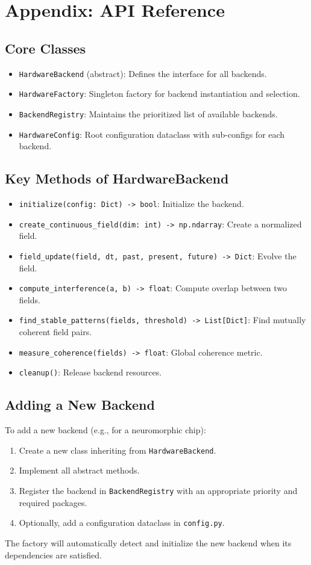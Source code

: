 \section{Appendix: API Reference}

\subsection{Core Classes}
\begin{itemize}
    \item \texttt{HardwareBackend} (abstract): Defines the interface for all backends.
    \item \texttt{HardwareFactory}: Singleton factory for backend instantiation and selection.
    \item \texttt{BackendRegistry}: Maintains the prioritized list of available backends.
    \item \texttt{HardwareConfig}: Root configuration dataclass with sub-configs for each backend.
\end{itemize}

\subsection{Key Methods of HardwareBackend}
\begin{itemize}
    \item \texttt{initialize(config: Dict) -> bool}: Initialize the backend.
    \item \texttt{create\_continuous\_field(dim: int) -> np.ndarray}: Create a normalized field.
    \item \texttt{field\_update(field, dt, past, present, future) -> Dict}: Evolve the field.
    \item \texttt{compute\_interference(a, b) -> float}: Compute overlap between two fields.
    \item \texttt{find\_stable\_patterns(fields, threshold) -> List[Dict]}: Find mutually coherent field pairs.
    \item \texttt{measure\_coherence(fields) -> float}: Global coherence metric.
    \item \texttt{cleanup()}: Release backend resources.
\end{itemize}

\subsection{Adding a New Backend}
To add a new backend (e.g., for a neuromorphic chip):
\begin{enumerate}
    \item Create a new class inheriting from \texttt{HardwareBackend}.
    \item Implement all abstract methods.
    \item Register the backend in \texttt{BackendRegistry} with an appropriate priority and required packages.
    \item Optionally, add a configuration dataclass in \texttt{config.py}.
\end{enumerate}
The factory will automatically detect and initialize the new backend when its dependencies are satisfied.